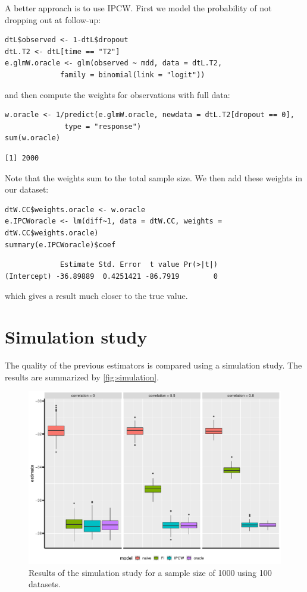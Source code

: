 \documentclass[12pt]{article}
\begin{document}
\clearpage

 A better approach is to use IPCW. First we model the probability of
not dropping out at follow-up:
\lstset{language=r,label= ,caption= ,captionpos=b,numbers=none}
\begin{lstlisting}
dtL$observed <- 1-dtL$dropout
dtL.T2 <- dtL[time == "T2"]
e.glmW.oracle <- glm(observed ~ mdd, data = dtL.T2,
		     family = binomial(link = "logit"))
\end{lstlisting}

and then compute the weights for observations with full data:

\lstset{language=r,label= ,caption= ,captionpos=b,numbers=none}
\begin{lstlisting}
w.oracle <- 1/predict(e.glmW.oracle, newdata = dtL.T2[dropout == 0],
		      type = "response")
sum(w.oracle)
\end{lstlisting}

\begin{verbatim}
[1] 2000
\end{verbatim}


Note that the weights sum to the total sample size. We then add these
weights in our dataset:
\lstset{language=r,label= ,caption= ,captionpos=b,numbers=none}
\begin{lstlisting}
dtW.CC$weights.oracle <- w.oracle
e.IPCWoracle <- lm(diff~1, data = dtW.CC, weights = dtW.CC$weights.oracle)
summary(e.IPCWoracle)$coef
\end{lstlisting}

\begin{verbatim}
             Estimate Std. Error  t value Pr(>|t|)
(Intercept) -36.89889  0.4251421 -86.7919        0
\end{verbatim}


which gives a result much closer to the true value.

\section{Simulation study}
\label{sec:org5718611}

The quality of the previous estimators is compared using a simulation
study. The results are summarized by \autoref{fig:simulation}.

\begin{figure}[!h]
\centering
\includegraphics[width=\textwidth]{./figures/simStudy-bias.pdf}
\caption{\label{fig:simulation}Results of the simulation study for a sample size of 1000 using 100 datasets.}
\end{figure}
\end{document}
